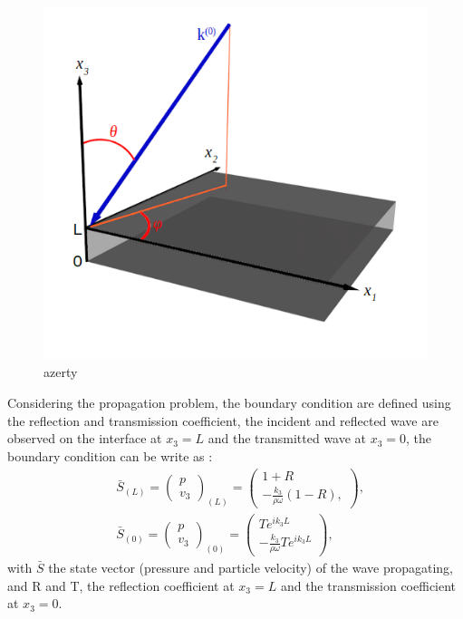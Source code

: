 \documentclass{article}
\begin{document}
    \begin{figure}[ht!]
        \centering
        \includegraphics[scale=0.6]{Fig3D.png}
        \caption{azerty}
        \label{Schema_PB}
    \end{figure}
    
    Considering the propagation problem, the boundary condition are defined using the reflection and transmission coefficient, the incident and reflected wave are observed on the interface at $x_3=L$ and the transmitted wave at $x_3=0$, the boundary condition can be write as :
     \begin{align}
    &\bar{S}_{(L)}=\begin{pmatrix}
    	p \\ v_3
    \end{pmatrix}_{(L)}=\begin{pmatrix}
    					    1+R \\ -\frac{k_3}{\rho \omega}(1-R),
    					\end{pmatrix},\label{BC_L} \\
  	&\bar{S}_{(0)}=\begin{pmatrix}
    	p \\ v_3
    \end{pmatrix}_{(0)}=\begin{pmatrix}
    						Te^{ik_3L} \\ -\frac{k_3}{\rho \omega}Te^{ik_3L}
    					\end{pmatrix},\label{BC_0}
    \end{align}                         
    with $\bar{S}$ the state vector (pressure and particle velocity) of the wave propagating, and R and T, the reflection coefficient at $x_3=L$ and the transmission coefficient at $x_3=0$.  
    
\end{document}
